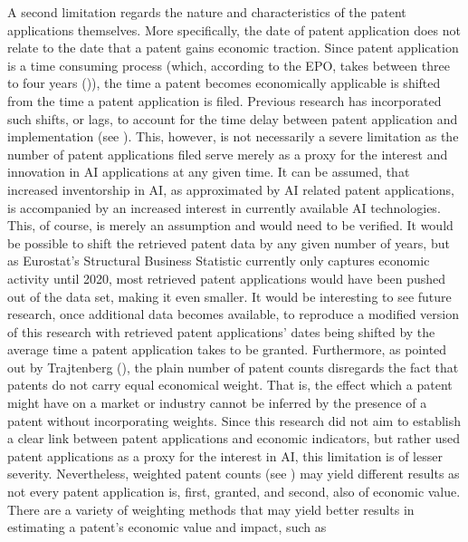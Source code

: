 \documentclass[
  12pt,
  a4paperpaper,
]{article}
\begin{document}
A second limitation regards the nature and characteristics of the patent
applications themselves. More specifically, the date of patent
application does not relate to the date that a patent gains economic
traction. Since patent application is a time consuming process (which,
according to the EPO, takes between three to four years
()), the time a patent becomes economically applicable is
shifted from the time a patent application is filed. Previous research
has incorporated such shifts, or lags, to account for the time delay
between patent application and implementation (see
).
This, however, is not necessarily a severe limitation as the number of
patent applications filed serve merely as a proxy for the interest and
innovation in AI applications at any given time. It can be assumed, that
increased inventorship in AI, as approximated by AI related patent
applications, is accompanied by an increased interest in currently
available AI technologies. This, of course, is merely an assumption and
would need to be verified. It would be possible to shift the retrieved
patent data by any given number of years, but as Eurostat's Structural
Business Statistic currently only captures economic activity until 2020,
most retrieved patent applications would have been pushed out of the
data set, making it even smaller. It would be interesting to see future
research, once additional data becomes available, to reproduce a
modified version of this research with retrieved patent applications'
dates being shifted by the average time a patent application takes to be
granted. Furthermore, as pointed out by Trajtenberg
(), the plain number of
patent counts disregards the fact that patents do not carry equal
economical weight. That is, the effect which a patent might have on a
market or industry cannot be inferred by the presence of a patent
without incorporating weights. Since this research did not aim to
establish a clear link between patent applications and economic
indicators, but rather used patent applications as a proxy for the
interest in AI, this limitation is of lesser severity. Nevertheless,
weighted patent counts (see ) may yield different results as not every patent
application is, first, granted, and second, also of economic value.
There are a variety of weighting methods that may yield better results
in estimating a patent's economic value and impact, such as
\end{document}
